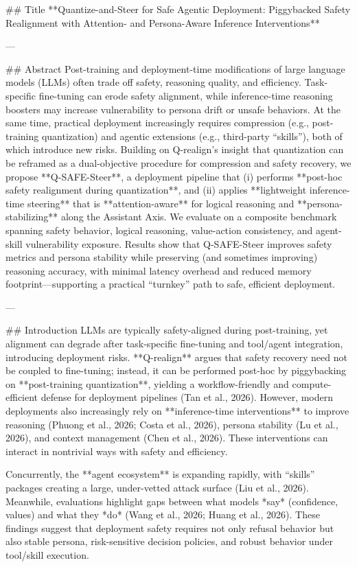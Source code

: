 ## Title  
**Quantize-and-Steer for Safe Agentic Deployment: Piggybacked Safety Realignment with Attention- and Persona-Aware Inference Interventions**

---

## Abstract  
Post-training and deployment-time modifications of large language models (LLMs) often trade off safety, reasoning quality, and efficiency. Task-specific fine-tuning can erode safety alignment, while inference-time reasoning boosters may increase vulnerability to persona drift or unsafe behaviors. At the same time, practical deployment increasingly requires compression (e.g., post-training quantization) and agentic extensions (e.g., third-party “skills”), both of which introduce new risks. Building on Q-realign’s insight that quantization can be reframed as a dual-objective procedure for compression and safety recovery, we propose **Q-SAFE-Steer**, a deployment pipeline that (i) performs **post-hoc safety realignment during quantization**, and (ii) applies **lightweight inference-time steering** that is **attention-aware** for logical reasoning and **persona-stabilizing** along the Assistant Axis. We evaluate on a composite benchmark spanning safety behavior, logical reasoning, value-action consistency, and agent-skill vulnerability exposure. Results show that Q-SAFE-Steer improves safety metrics and persona stability while preserving (and sometimes improving) reasoning accuracy, with minimal latency overhead and reduced memory footprint—supporting a practical “turnkey” path to safe, efficient deployment.

---

## Introduction  
LLMs are typically safety-aligned during post-training, yet alignment can degrade after task-specific fine-tuning and tool/agent integration, introducing deployment risks. **Q-realign** argues that safety recovery need not be coupled to fine-tuning; instead, it can be performed post-hoc by piggybacking on **post-training quantization**, yielding a workflow-friendly and compute-efficient defense for deployment pipelines (Tan et al., 2026). However, modern deployments also increasingly rely on **inference-time interventions** to improve reasoning (Phuong et al., 2026; Costa et al., 2026), persona stability (Lu et al., 2026), and context management (Chen et al., 2026). These interventions can interact in nontrivial ways with safety and efficiency.

Concurrently, the **agent ecosystem** is expanding rapidly, with “skills” packages creating a large, under-vetted attack surface (Liu et al., 2026). Meanwhile, evaluations highlight gaps between what models *say* (confidence, values) and what they *do* (Wang et al., 2026; Huang et al., 2026). These findings suggest that deployment safety requires not only refusal behavior but also stable persona, risk-sensitive decision policies, and robust behavior under tool/skill execution.

